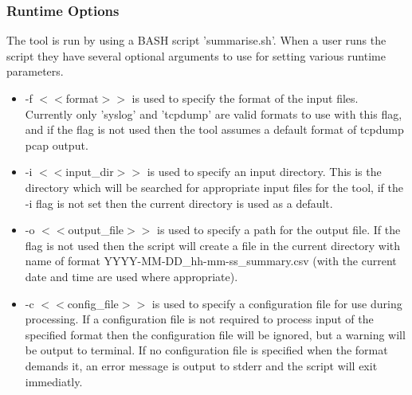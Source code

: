 \subsubsection{Runtime Options}
The tool is run by using a BASH script 'summarise.sh'. When a user runs the script they have several optional arguments to use for setting various runtime parameters. 
\begin{itemize}
    \item -f $<<$format$>>$ is used to specify the format of the input files. Currently only 'syslog' and 'tcpdump' are valid formats to use with this flag, and if the flag is not used then the tool assumes a default format of tcpdump pcap output.
    \item -i $<<$input\_dir$>>$ is used to specify an input directory. This is the directory which will be searched for appropriate input files for the tool, if the -i flag is not set then the current directory is used as a default.
    \item -o $<<$output\_file$>>$ is used to specify a path for the output file. If the flag is not used then the script will create a file in the current directory with name of format YYYY-MM-DD\_hh-mm-ss\_summary.csv (with the current date and time are used where appropriate).
    \item -c $<<$config\_file$>>$ is used to specify a configuration file for use during processing. If a configuration file is not required to process input of the specified format then the configuration file will be ignored, but a warning will be output to terminal. If no configuration file is specified when the format demands it, an error message is output to stderr and the script will exit immediatly.
\end{itemize}
